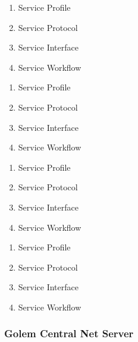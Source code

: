 \begin{enumerate}
    \item Service Profile
    \item Service Protocol
    \item Service Interface
    \item Service Workflow
\end{enumerate}


\begin{enumerate}
    \item Service Profile
    \item Service Protocol
    \item Service Interface
    \item Service Workflow
\end{enumerate}


\begin{enumerate}
    \item Service Profile
    \item Service Protocol
    \item Service Interface
    \item Service Workflow
\end{enumerate}


\begin{enumerate}
    \item Service Profile
    \item Service Protocol
    \item Service Interface
    \item Service Workflow
\end{enumerate}








\subsubsection{Golem Central Net Server}

